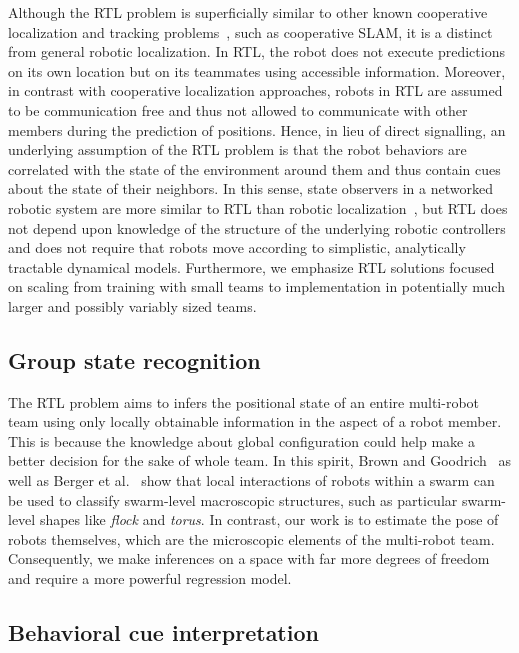 \documentclass[letterpaper, 10 pt, conference]{ieeeconf}  %
\begin{document}
    Although the RTL problem is superficially similar to other known
    cooperative localization and tracking problems~\cite{GKD04, LSRB16,
    FSDO10, CX14, DMG15}, such as cooperative SLAM, it is a distinct
    from general robotic localization. In RTL, the robot does not
    execute predictions on its own location but on its teammates using
    accessible information. Moreover, in contrast with cooperative
    localization approaches, robots in RTL are assumed to be
    communication free and thus not allowed to communicate with other
    members during the prediction of positions. Hence, in lieu of direct
    signalling, an underlying assumption of the RTL problem is that the
    robot behaviors are correlated with the state of the environment
    around them and thus contain cues about the state of their
    neighbors. In this sense, state observers in a networked robotic
    system are more similar to RTL than robotic
    localization~\cite{XNX10, GACM12}, but RTL does not depend upon
    knowledge of the structure of the underlying robotic controllers and
    does not require that robots move according to simplistic,
    analytically tractable dynamical models. Furthermore, we emphasize
    RTL solutions focused on scaling from training with small teams to
    implementation in potentially much larger and possibly variably
    sized teams.

	\subsection{Group state recognition}
	\label{sec:group_state_recognition}

    The RTL problem aims to infers the positional state of an entire
    multi-robot team using only locally obtainable information in the
    aspect of a robot member. This is because the knowledge about global
    configuration could help make a better decision for the sake of
    whole team. In this spirit, Brown and Goodrich~\cite{BG14} as well
    as Berger et al.~\cite{BSB16} show that local interactions of robots
    within a swarm can be used to classify swarm-level macroscopic
    structures, such as particular swarm-level shapes like \emph{flock}
    and \emph{torus}. In contrast, our work is to estimate the pose of
    robots themselves, which are the microscopic elements of the
    multi-robot team. Consequently, we make inferences on a space with
    far more degrees of freedom and require a more powerful regression
    model.

	\subsection{Behavioral cue interpretation}
	\label{sec:behavioral_cue_interpretation}
\end{document}
